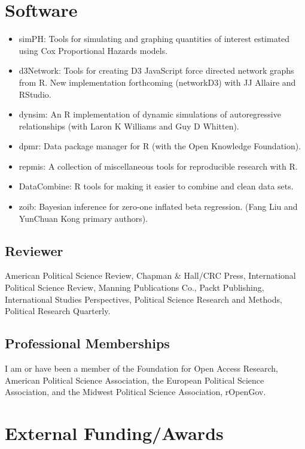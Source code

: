 \documentclass[a4paper]{article}
\begin{document}
{{\section*{Software}

\begin{itemize}
	\item simPH: Tools for simulating and graphing quantities of interest estimated using Cox Proportional Hazards models.
	\item d3Network: Tools for creating D3 JavaScript force directed network graphs from R. New implementation forthcoming (networkD3) with JJ Allaire and RStudio.
	\item dynsim: An R implementation of dynamic simulations of autoregressive relationships (with Laron K Williams and Guy D Whitten).
	\item dpmr: Data package manager for R (with the Open Knowledge Foundation).
	\item repmis: A collection of miscellaneous tools for reproducible research with R.
	\item DataCombine: R tools for making it easier to combine and clean data sets.
    \item zoib: Bayesian inference for zero-one inflated beta regression. (Fang Liu and YunChuan Kong primary authors).
\end{itemize}

\subsection*{Reviewer}

 American Political Science Review, Chapman \& Hall/CRC Press, International Political Science Review, Manning Publications Co., Packt Publishing, International Studies Perspectives, Political Science Research and Methods, Political Research Quarterly.

\subsection*{Professional Memberships}

I am or have been a member of the Foundation for Open Access Research, American Political Science Association, the European Political Science Association, and the Midwest Political Science Association, rOpenGov.

\section*{External Funding/Awards}

}}
\end{document}
